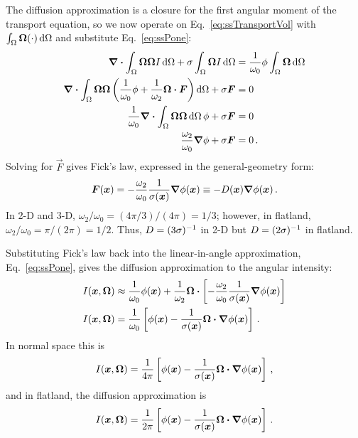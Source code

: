 The diffusion approximation is a closure for the first angular moment of
the transport equation, so we now operate on Eq.~\eqref{eq:ssTransportVol} with
$\int_\Omega \bm{\Omega} (\cdot) \mathop{}\!\mathrm{d} \Omega$ and substitute
Eq.~\eqref{eq:ssPone}:
\begin{align*}
  \bm{\nabla} \bm{\cdot} \int_\Omega \bm{\Omega} \bm{\Omega} I
  \mathop{}\!\mathrm{d}\Omega
  + \sigma \int_\Omega \bm{\Omega} I \mathop{}\!\mathrm{d}\Omega
  &= \frac{1}{\omega_0} \phi \int_\Omega \bm{\Omega} \mathop{}\!\mathrm{d}\Omega
  \\
  \bm{\nabla} \bm{\cdot} \int_\Omega \bm{\Omega} \bm{\Omega} \left(
  \frac{1}{\omega_0}\phi + \frac{1}{\omega_2} \bm{\Omega} \bm{\cdot} \bm{F}
  \right)
  \mathop{}\!\mathrm{d}\Omega
  + \sigma \bm{F}
  &= 0
  \\
  \frac{1}{\omega_0} \bm{\nabla} \bm{\cdot} \int_\Omega \bm{\Omega} \bm{\Omega}
  \mathop{}\!\mathrm{d}\Omega\, \phi 
  + \sigma \bm{F} &= 0
  \\
  \frac{\omega_2}{\omega_0} \bm{\nabla} \phi + \sigma \bm{F} &= 0 \,.
\end{align*}
Solving for $\vec{F}$ gives Fick's law, expressed in the general-geometry form:
\begin{equation} \label{eq:fickGeneral}
  \bm{F}(\bm{x})
  = - \frac{\omega_2}{\omega_0} \frac{1}{\sigma(\bm{x})} \bm{\nabla} \phi(\bm{x})
  \equiv -D(\bm{x}) \bm{\nabla} \phi(\bm{x})\,.
\end{equation}
In 2-D and 3-D, $\omega_2/\omega_0 = (4\pi / 3) / (4\pi) = 1/3$; however, in
flatland, $\omega_2/\omega_0 = \pi / (2\pi) = 1/2$. Thus, $D=(3\sigma)^{-1}$ in
2-D but $D=(2\sigma)^{-1}$ in flatland.

Substituting Fick's law back into the linear-in-angle approximation,
Eq.~\eqref{eq:ssPone}, gives the diffusion approximation to the angular
intensity:
\begin{align} \nonumber
  I(\bm{x}, \bm{\Omega})
  &\approx \frac{1}{\omega_0} \phi(\bm{x})
  + \frac{1}{\omega_2} \bm{\Omega} \bm{\cdot} \left[ - \frac{\omega_2}{\omega_0}
  \frac{1}{\sigma(\bm{x})} \bm{\nabla} \phi(\bm{x}) \right]
  \\ \label{eq:diffusionIntensity}
  I(\bm{x}, \bm{\Omega})
  &= \frac{1}{\omega_0} \left[ \phi(\bm{x})
  - \frac{1}{\sigma(\bm{x})}
  \bm{\Omega} \bm{\cdot} \bm{\nabla} \phi(\bm{x}) \right] \,.
\end{align}
In normal space this is
\begin{equation*}
 I(\bm{x}, \bm{\Omega})
= \frac{1}{4\pi} \left[ \phi(\bm{x}) - \frac{1}{\sigma(\bm{x})} \bm{\Omega}
\bm{\cdot} \bm{\nabla} \phi(\bm{x}) \right] \,,
\end{equation*}
and in flatland, the diffusion approximation is
\begin{equation}\label{eq:flatlandDiffusion}
 I(\bm{x}, \bm{\Omega})
= \frac{1}{2\pi} \left[ \phi(\bm{x}) - \frac{1}{\sigma(\bm{x})} \bm{\Omega}
\bm{\cdot} \bm{\nabla} \phi(\bm{x}) \right]\,.
\end{equation}

